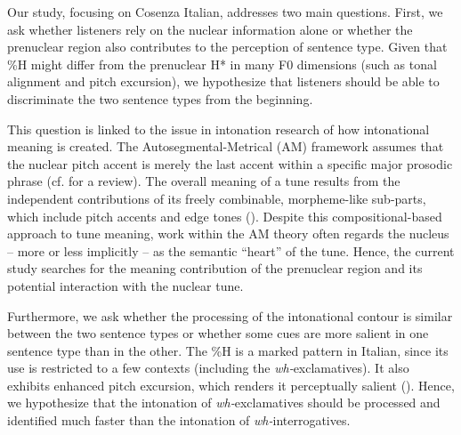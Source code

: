 \documentclass[output=paper]{langsci/langscibook}
\begin{document}
Our study, focusing on Cosenza Italian, addresses two main questions. First, we ask whether listeners rely on the nuclear information alone or whether the prenuclear region also contributes to the perception of sentence type. Given that \%H might differ from the prenuclear H* in many F0 dimensions (such as tonal alignment and pitch excursion), we hypothesize that listeners should be able to discriminate the two sentence types from the beginning.

This question is linked to the issue in intonation research of how intonational meaning is created. The Autosegmental-Metrical (AM) framework assumes that the nuclear pitch accent is merely the last accent within a specific major prosodic phrase (cf. \citealt{Ladd2008} for a review). The overall meaning of a tune results from the independent contributions of its freely combinable, morpheme-like sub-parts, which include pitch accents and edge tones (\citealt{Pierrehumbert1990}). Despite this compositional-based approach to tune meaning, work within the AM theory often regards the nucleus – more or less implicitly – as the semantic “heart” of the tune. Hence, the current study searches for the meaning contribution of the prenuclear region and its potential interaction with the nuclear tune.

Furthermore, we ask whether the processing of the intonational contour is similar between the two sentence types or whether some cues are more salient in one sentence type than in the other. The \%H is a marked pattern in Italian, since its use is restricted to a few contexts (including the \textit{wh-}exclamatives). It also exhibits enhanced pitch excursion, which renders it perceptually salient (\citealt{Sorianello2012}). Hence, we hypothesize that the intonation of \textit{wh-}exclamatives should be processed and identified much faster than the intonation of \textit{wh-}interrogatives.
\end{document}
